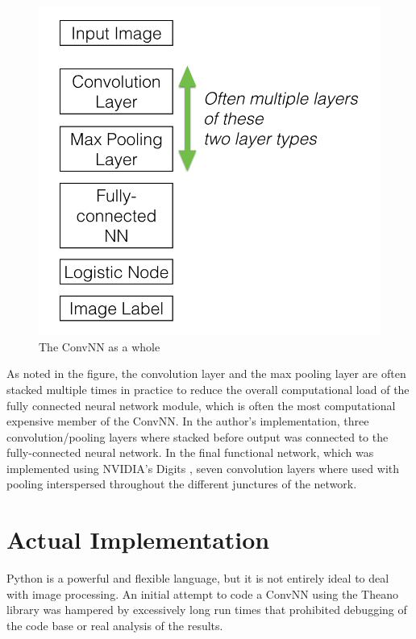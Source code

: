 \documentclass[letterpaper,12pt]{article}
\begin{document}
\begin{figure}[htbp]
\begin{center}
\includegraphics[scale=0.6]{images/summaryNN.png}
\caption{The ConvNN as a whole}
\label{summary}
\end{center}
\end{figure}

As noted in the figure, the convolution layer and the max pooling layer are often stacked multiple times in practice to reduce the overall computational load of the fully connected neural network module, which is often the most computational expensive member of the ConvNN. In the author's implementation, three convolution/pooling layers where stacked before output was connected to the fully-connected neural network. In the final functional network, which was implemented using NVIDIA's Digits \cite{digits}, seven convolution layers where used with pooling interspersed throughout the different junctures of the network.

\section{Actual Implementation}

Python is a powerful and flexible language, but it is not entirely ideal to deal with image processing. An initial attempt to code a ConvNN using the Theano library \cite{theano} was hampered by excessively long run times that prohibited debugging of the code base or real analysis of the results.
\end{document}
